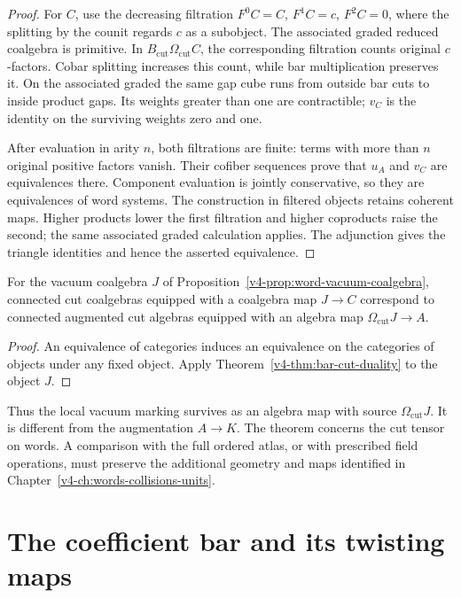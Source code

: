 \begin{proof}
For \(C\), use the decreasing filtration
\(F^0C=C\), \(F^1C=c\), \(F^2C=0\), where the splitting by the
counit regards \(c\) as a subobject. The associated graded reduced
coalgebra is primitive. In \(B_{\mathrm{cut}}\Omega_{\mathrm{cut}}C\),
the corresponding filtration counts original \(c\)-factors.
Cobar splitting increases this count, while bar multiplication
preserves it. On the associated graded the same gap cube runs from
outside bar cuts to inside product gaps. Its weights greater than
one are contractible; \(v_C\) is the identity on the surviving
weights zero and one.

After evaluation in arity \(n\), both filtrations are finite:
terms with more than \(n\) original positive factors vanish.
Their cofiber sequences prove that \(u_A\) and \(v_C\) are
equivalences there. Component evaluation is jointly conservative,
so they are equivalences of word systems. The construction in
filtered objects retains coherent maps. Higher products lower the
first filtration and higher coproducts raise the second; the same
associated graded calculation applies. The adjunction gives the
triangle identities and hence the asserted equivalence.
\end{proof}

\begin{corollary}\label{v4-cor:bar-vacuum-under}
For the vacuum coalgebra \(J\) of
Proposition~\ref{v4-prop:word-vacuum-coalgebra}, connected cut
coalgebras equipped with a coalgebra map \(J\to C\) correspond to
connected augmented cut algebras equipped with an algebra map
\(\Omega_{\mathrm{cut}}J\to A\).
\end{corollary}

\begin{proof}
An equivalence of categories induces an equivalence on the
categories of objects under any fixed object. Apply
Theorem~\ref{v4-thm:bar-cut-duality} to the object \(J\).
\end{proof}

Thus the local vacuum marking survives as an algebra map with
source \(\Omega_{\mathrm{cut}}J\). It is different from the
augmentation \(A\to K\). The theorem concerns the cut tensor on
words. A comparison with the full ordered atlas, or with prescribed
field operations, must preserve the additional geometry and maps
identified in Chapter~\ref{v4-ch:words-collisions-units}.

\section{The coefficient bar and its twisting maps}
\label{v4-sec:bar-coefficients}

